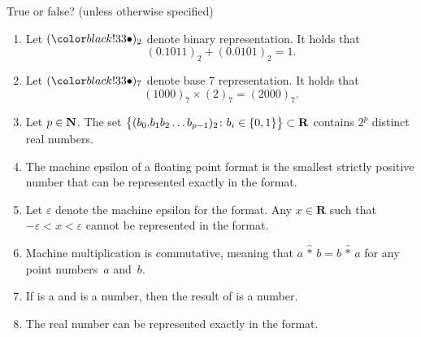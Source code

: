 \documentclass[a4paper]{article}
\begin{document}
\pagestyle{empty}
\thispagestyle{fancy}



True or false? (unless otherwise specified)

\begin{enumerate}

    \item
        Let $(\placeholder)_2$ denote binary representation.
        It holds that
        \[
            (0.1011)_2 + (0.0101)_2 = 1.
        \]

    \item
        Let $(\placeholder)_7$ denote base 7 representation.
        It holds that
        \[
            (1000)_7 \times (2)_7 = (2000)_7.
        \]

    \item
        Let $p \in \mathbf N$.
        The set
        \(
            \bigl\{ (b_0. b_1 b_2 \dots b_{p-1})_2 \colon b_i \in \{0, 1\} \bigr\} \subset \mathbf R
        \)
        contains $2^{p}$ distinct real numbers.

    \item
        The machine epsilon of a floating point format is the smallest strictly positive number that can be represented exactly in the format.

    \item
        Let $\varepsilon$ denote the machine epsilon for the  format.
        Any $x \in \mathbf R$ such that $-\varepsilon < x < \varepsilon$
        cannot be represented in the  format.

    \item
        Machine multiplication is commutative,
        meaning that $a \,{\widehat *}\, b = b \,{\widehat *}\, a$
        for any  point numbers~$a$ and~$b$.

    \item
        If  is a  and  is a  number,
        then the result of  is a  number.

    \item
        The real number  can be represented exactly in the  format.


\end{enumerate}
\end{document}
